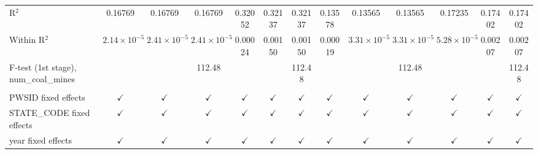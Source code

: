 \begin{table}[htbp]
\begin{adjustbox}{width = \textwidth, center}
\begin{tabular}{lcccccccccccc}
         R$^2$                                  & 0.16769                & 0.16769               & 0.16769               & 0.32052       & 0.32137        & 0.32137       & 0.13578       & 0.13565               & 0.13565               & 0.17235               & 0.17402         & 0.17402\\  
         Within R$^2$                           & $2.14\times 10^{-5}$   & $2.41\times 10^{-5}$  & $2.41\times 10^{-5}$  & 0.00024       & 0.00150        & 0.00150       & 0.00019       & $3.31\times 10^{-5}$  & $3.31\times 10^{-5}$  & $5.28\times 10^{-5}$  & 0.00207         & 0.00207\\  
         F-test (1st stage), num\_coal\_mines   &                        &                       & 112.48                &               &                & 112.48        &               &                       & 112.48                &                       &                 & 112.48\\  
          \\
         PWSID fixed effects                    & $\checkmark$           & $\checkmark$          & $\checkmark$          & $\checkmark$  & $\checkmark$   & $\checkmark$  & $\checkmark$  & $\checkmark$          & $\checkmark$          & $\checkmark$          & $\checkmark$    & $\checkmark$\\   
         STATE\_CODE fixed effects              & $\checkmark$           & $\checkmark$          & $\checkmark$          & $\checkmark$  & $\checkmark$   & $\checkmark$  & $\checkmark$  & $\checkmark$          & $\checkmark$          & $\checkmark$          & $\checkmark$    & $\checkmark$\\   
         year fixed effects                     & $\checkmark$           & $\checkmark$          & $\checkmark$          & $\checkmark$  & $\checkmark$   & $\checkmark$  & $\checkmark$  & $\checkmark$          & $\checkmark$          & $\checkmark$          & $\checkmark$    & $\checkmark$\\   
         \bottomrule
      \end{tabular}
   \end{adjustbox}
\end{table}



